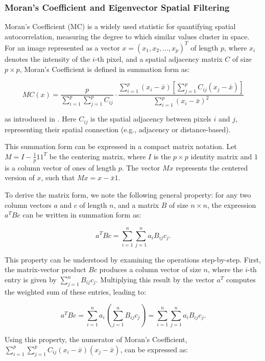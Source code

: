 \documentclass[12pt]{article}
\begin{document}
\subsubsection{Moran's Coefficient and Eigenvector Spatial Filtering}

Moran’s Coefficient (MC) is a widely used statistic for quantifying spatial autocorrelation, measuring the degree to which similar values cluster in space. For an image represented as a vector \( x = (x_1, x_2, \dots, x_p)^T \) of length \( p \), where \( x_i \) denotes the intensity of the \( i \)-th pixel, and a spatial adjacency matrix \( C \) of size \( p \times p \), Moran’s Coefficient is defined in summation form as:

\[
  M C(x) = \frac{p}{\sum_{i=1}^p \sum_{j=1}^p C_{ij}} \cdot \frac{\sum_{i=1}^p \left(x_i - \bar{x} \right) \left[ \sum_{j=1}^p C_{ij} \left( x_j - \bar{x} \right) \right]}{\sum_{i=1}^p \left( x_i - \bar{x} \right)^2}
\]

as introduced in \citet{griffith2014spatial}. Here \( C_{ij} \) is the spatial adjacency between pixels \( i \) and \( j \), representing their spatial connection (e.g., adjacency or distance-based).

This summation form can be expressed in a compact matrix notation. Let \( M = I - \frac{1}{p} 1 1^T \) be the centering matrix, where \( I \) is the \( p \times p \) identity matrix and \( 1 \) is a column vector of ones of length \( p \). The vector \( Mx \) represents the centered version of \( x \), such that \( Mx = x - \bar{x}1 \).

To derive the matrix form, we note the following general property: for any two column vectors \( a \) and \( c \) of length \( n \), and a matrix \( B \) of size \( n \times n \), the expression \( a^T B c \) can be written in summation form as:

\[
  a^T B c = \sum_{i=1}^n \sum_{j=1}^n a_i B_{ij} c_j.
\]

This property can be understood by examining the operations step-by-step. First, the matrix-vector product \( Bc \) produces a column vector of size \( n \), where the \( i \)-th entry is given by \( \sum_{j=1}^n B_{ij} c_j \). Multiplying this result by the vector \( a^T \) computes the weighted sum of these entries, leading to:

\[
  a^T B c = \sum_{i=1}^n a_i \left( \sum_{j=1}^n B_{ij} c_j \right) = \sum_{i=1}^n \sum_{j=1}^n a_i B_{ij} c_j.
\]

Using this property, the numerator of Moran's Coefficient, \( \sum_{i=1}^p \sum_{j=1}^p C_{ij} (x_i - \bar{x})(x_j - \bar{x}) \), can be expressed as:
\end{document}
